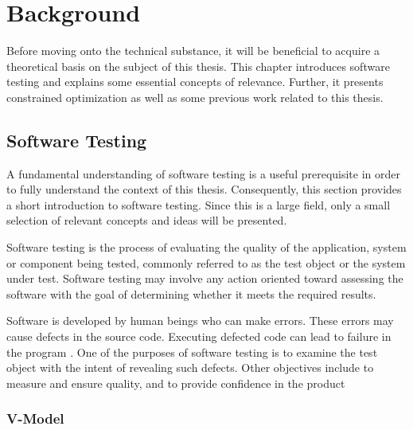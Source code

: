 \section{Background}\label{chapter.background}
\thispagestyle{plain}
Before moving onto the technical substance, it will be beneficial to acquire a theoretical basis on the subject of this thesis. This chapter introduces software testing and explains some essential concepts of relevance. Further, it presents constrained optimization as well as some previous work related to this thesis.

\subsection{Software Testing}

A fundamental understanding of software testing is a useful prerequisite in order to fully understand the context of this thesis. Consequently, this section provides a short introduction to software testing. Since this is a large field, only a small selection of relevant concepts and ideas will be presented.  %

Software testing is the process of evaluating the quality of the application, system or component being tested, commonly referred to as the test object or the system under test. Software testing may involve any action oriented toward assessing the software with the goal of determining whether it meets the required results. \cite{[http://istqbexamcertification.com/what-is-a-software-testing/]}

Software is developed by human beings who can make errors. These errors may cause defects in the source code. Executing defected code can lead to failure in the program  \cite{http://www.istqb.org/downloads/send/2-foundation-level-documents/3-foundation-level-syllabus-2011.html}. One of the purposes of software testing is to examine the test object with the intent of revealing such defects. Other objectives include to measure and ensure quality, and to provide confidence in the product \cite[pp. 8]{SoftwareTestingFoundations}

\subsubsection{V-Model}

